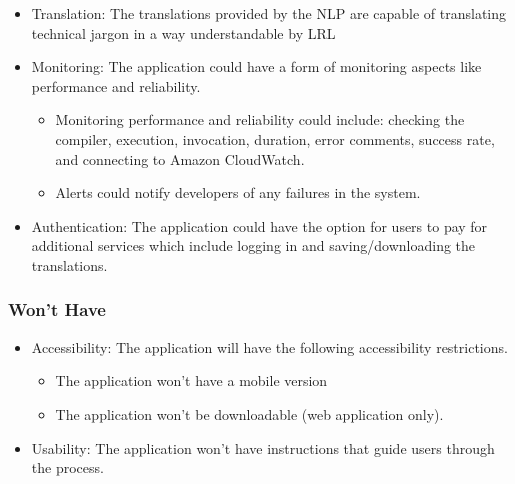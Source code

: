 \begin{itemize}
\item Translation: The translations provided by the NLP are capable of translating technical jargon in a way understandable by LRL
\item Monitoring: The application could have a form of monitoring aspects like performance and reliability. 
\begin{itemize}
\item Monitoring performance and reliability could include: checking the compiler, execution, invocation, duration, error comments, success rate, and connecting to \gls{Amazon CloudWatch}. 
\item Alerts could notify developers of any failures in the system.
\end{itemize}
\item Authentication: The application could have the option for users to pay for additional services which include logging in and saving/downloading the translations. 
\end{itemize}

\noindent \subsubsection*{Won't Have}

\begin{itemize}
\item Accessibility: The application will have the following accessibility restrictions. 
\begin{itemize}
\item The application won't have a mobile version
\item The application won't be downloadable (web application only).
\end{itemize}
\item Usability: The application won't have instructions that guide users through the process.
\end{itemize}
